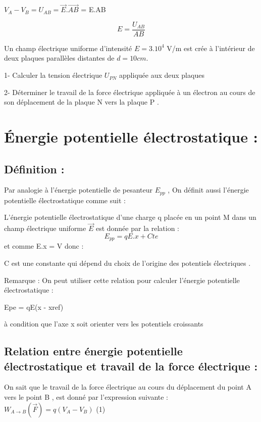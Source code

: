\documentclass[12pt]{article}
\begin{document}
$V_A - V_B = U_{AB} =  \vec{E}.\overrightarrow{AB}$ = E.AB

$$E = \frac{U_{AB}}{AB}$$


\begin{tcolorbox}[colback=pink!10!white,
                  colframe=blue!15!gray,
                  title=Application -1- :
                 ]
Un champ électrique uniforme d’intensité $E = 3.10^4$ V/m est crée à
l’intérieur de deux plaques parallèles distantes de $d = 10cm$.

  1- Calculer la tension électrique $U_{PN}$ appliquée aux deux
plaques

  2- Déterminer le travail de la force électrique appliquée à un
électron au cours de son déplacement de la plaque N vers la
plaque P .
\end{tcolorbox}

\section{Énergie potentielle électrostatique : }
\subsection{Définition : }
Par analogie à l’énergie potentielle de pesanteur $E_{pp}$ , On définit
aussi l’énergie potentielle électrostatique comme suit :

L’énergie potentielle électrostatique d’une charge q placée en un
point M dans un champ électrique uniforme $\vec{E}$ est donnée par la
relation :
$$E_{pp} = qE.x + Cte$$
et comme E.x = V donc  :
\begin{center}
\end{center}
C est une constante qui dépend du choix de l’origine des potentiels
électriques .

\begin{tcolorbox}
Remarque :
On peut utiliser cette relation pour calculer l’énergie potentielle
électrostatique :

  Epe = qE(x - xref)

  à condition que l’axe x soit orienter vers les potentiels croissants
\end{tcolorbox}
\subsection{Relation entre énergie potentielle électrostatique et travail de la
force électrique : }
On sait que le travail de la force électrique au cours du
déplacement du point A vers le point B , est donné par
l’expression suivante : 
$W_{A\rightarrow B}(\vec{F}) = q(V_A - V_B) $ (1)
\end{document}
